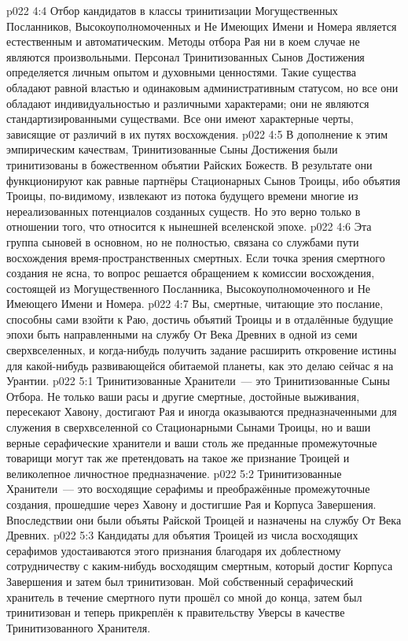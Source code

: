 \vs p022 4:4 \pc Отбор кандидатов в классы тринитизации Могущественных Посланников, Высокоуполномоченных и Не Имеющих Имени и Номера является естественным и автоматическим. Методы отбора Рая ни в коем случае не являются произвольными. Персонал Тринитизованных Сынов Достижения определяется личным опытом и духовными ценностями. Такие существа обладают равной властью и одинаковым административным статусом, но все они обладают индивидуальностью и различными характерами; они не являются стандартизированными существами. Все они имеют характерные черты, зависящие от различий в их путях восхождения.
\vs p022 4:5 В дополнение к этим эмпирическим качествам, Тринитизованные Сыны Достижения были тринитизованы в божественном объятии Райских Божеств. В результате они функционируют как равные партнёры Стационарных Сынов Троицы, ибо объятия Троицы, по\hyp{}видимому, извлекают из потока будущего времени многие из нереализованных потенциалов созданных существ. Но это верно только в отношении того, что относится к нынешней вселенской эпохе.
\vs p022 4:6 Эта группа сыновей в основном, но не полностью, связана со службами пути восхождения время\hyp{}пространственных смертных. Если точка зрения смертного создания не ясна, то вопрос решается обращением к комиссии восхождения, состоящей из Могущественного Посланника, Высокоуполномоченного и Не Имеющего Имени и Номера.
\vs p022 4:7 Вы, смертные, читающие это послание, способны сами взойти к Раю, достичь объятий Троицы и в отдалённые будущие эпохи быть направленными на службу От Века Древних в одной из семи сверхвселенных, и когда\hyp{}нибудь получить задание расширить откровение истины для какой\hyp{}нибудь развивающейся обитаемой планеты, как это делаю сейчас я на Урантии.
\vs p022 5:1 Тринитизованные Хранители~--- это Тринитизованные Сыны Отбора. Не только ваши расы и другие смертные, достойные выживания, пересекают Хавону, достигают Рая и иногда оказываются предназначенными для служения в сверхвселенной со Стационарными Сынами Троицы, но и ваши верные серафические хранители и ваши столь же преданные промежуточные товарищи могут так же претендовать на такое же признание Троицей и великолепное личностное предназначение.
\vs p022 5:2 Тринитизованные Хранители~--- это восходящие серафимы и преображённые промежуточные создания, прошедшие через Хавону и достигшие Рая и Корпуса Завершения. Впоследствии они были объяты Райской Троицей и назначены на службу От Века Древних.
\vs p022 5:3 Кандидаты для объятия Троицей из числа восходящих серафимов удостаиваются этого признания благодаря их доблестному сотрудничеству с каким\hyp{}нибудь восходящим смертным, который достиг Корпуса Завершения и затем был тринитизован. Мой собственный серафический хранитель в течение смертного пути прошёл со мной до конца, затем был тринитизован и теперь прикреплён к правительству Уверсы в качестве Тринитизованного Хранителя.
